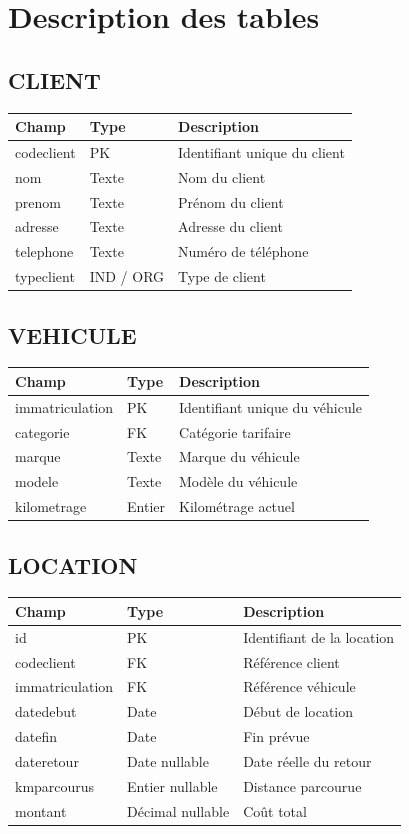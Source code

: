 \documentclass[12pt,a4paper]{report}
\begin{document}
\section{Description des tables}
\subsection{CLIENT}
\begin{longtable}{|p{4cm}|p{3cm}|p{7cm}|}
\hline
\textbf{Champ} & \textbf{Type} & \textbf{Description} \\\hline
codeclient & PK & Identifiant unique du client \\\hline
nom & Texte & Nom du client \\\hline
prenom & Texte & Prénom du client \\\hline
adresse & Texte & Adresse du client \\\hline
telephone & Texte & Numéro de téléphone \\\hline
typeclient & IND / ORG & Type de client \\\hline
\end{longtable}

\subsection{VEHICULE}
\begin{longtable}{|p{4cm}|p{3cm}|p{7cm}|}
\hline
\textbf{Champ} & \textbf{Type} & \textbf{Description} \\\hline
immatriculation & PK & Identifiant unique du véhicule \\\hline
categorie & FK & Catégorie tarifaire \\\hline
marque & Texte & Marque du véhicule \\\hline
modele & Texte & Modèle du véhicule \\\hline
kilometrage & Entier & Kilométrage actuel \\\hline
\end{longtable}

\subsection{LOCATION}
\begin{longtable}{|p{4cm}|p{3cm}|p{7cm}|}
\hline
\textbf{Champ} & \textbf{Type} & \textbf{Description} \\\hline
id & PK & Identifiant de la location \\\hline
codeclient & FK & Référence client \\\hline
immatriculation & FK & Référence véhicule \\\hline
datedebut & Date & Début de location \\\hline
datefin & Date & Fin prévue \\\hline
dateretour & Date nullable & Date réelle du retour \\\hline
kmparcourus & Entier nullable & Distance parcourue \\\hline
montant & Décimal nullable & Coût total \\\hline
\end{longtable}
\end{document}
